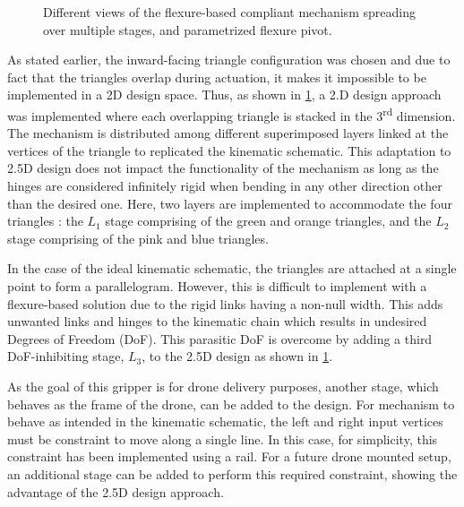 \begin{figure}[hbt!] %
  \centering
  \resizebox{0.9\textwidth}{!}{}
  \caption{Different views of the flexure-based compliant mechanism spreading over multiple stages, and parametrized flexure pivot.}
  \label{fig:mech_stages}
\end{figure}

As stated earlier, the inward-facing triangle configuration was chosen and due to fact that the triangles overlap during actuation, it makes it impossible to be implemented in a 2D design space. Thus, as shown in \cref{fig:mech_stages}, a 2.D design approach was implemented where each overlapping triangle is stacked in the 3\textsuperscript{rd} dimension. The mechanism is distributed among different superimposed layers linked at the vertices of the triangle to replicated the kinematic schematic. This adaptation to 2.5D design does not impact the functionality of the mechanism as long as the hinges are considered infinitely rigid when bending in any other direction other than the desired one. Here, two layers are implemented to accommodate the four triangles : the $L_1$ stage comprising of the green and orange triangles, and the $L_2$ stage comprising of the pink and blue triangles.

In the case of the ideal kinematic schematic, the triangles are attached at a single point to form a parallelogram. However, this is difficult to implement with a flexure-based solution due to the rigid links having a non-null width. This adds unwanted links and hinges to the kinematic chain which results in undesired Degrees of Freedom (DoF). This parasitic DoF is overcome by adding a third DoF-inhibiting stage, $L_3$, to the 2.5D design as shown in \cref{fig:mech_stages}.

As the goal of this gripper is for drone delivery purposes, another stage, which behaves as the frame of the drone, can be added to the design. For mechanism to behave as intended in the kinematic schematic, the left and right input vertices must be constraint to move along a single line. In this case, for simplicity, this constraint has been implemented using a rail. For a future drone mounted setup, an additional stage can be added to perform this required constraint, showing the advantage of the 2.5D design approach.

